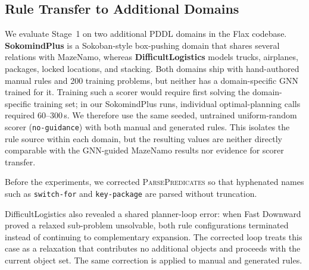 \documentclass{ieeeaccess}
\begin{document}
\subsection{Rule Transfer to Additional Domains}
\label{sec:crossdomain_results}

We evaluate Stage~1 on two additional PDDL domains in the Flax codebase. \textbf{SokomindPlus} is a Sokoban-style box-pushing domain that shares several relations with MazeNamo, whereas \textbf{DifficultLogistics} models trucks, airplanes, packages, locked locations, and stacking.
Both domains ship with hand-authored manual rules and 200 training problems, but neither has a domain-specific GNN trained for it.
Training such a scorer would require first solving the domain-specific training set; in our SokomindPlus runs, individual optimal-planning calls required 60--300\,s.
We therefore use the same seeded, untrained uniform-random scorer (\texttt{no-guidance}) with both manual and generated rules.
This isolates the rule source within each domain, but the resulting values are neither directly comparable with the GNN-guided MazeNamo results nor evidence for scorer transfer.

Before the experiments, we corrected \textsc{ParsePredicates} so that hyphenated names such as \texttt{switch-for} and \texttt{key-package} are parsed without truncation.

DifficultLogistics also revealed a shared planner-loop error: when Fast Downward proved a relaxed sub-problem unsolvable, both rule configurations terminated instead of continuing to complementary expansion.
The corrected loop treats this case as a relaxation that contributes no additional objects and proceeds with the current object set. The same correction is applied to manual and generated rules.
\end{document}
